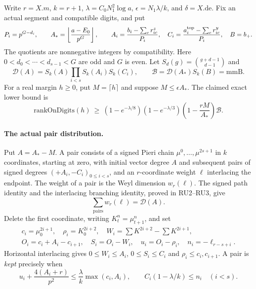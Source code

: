 \documentclass[11pt,a4paper]{article}
\numberwithin{equation}{section}
\theoremstyle{remark}\newtheorem{remark}[theorem]{Remark}
\begin{document}
Write $r=X.m$, $k=r+1$, $\lambda=C_0N_1^2\log a$,
$\epsilon=N_1\lambda/k$, and $\delta=X.\mathrm{de}$.
Fix an actual segment and compatible digits, and put
\[
 P_i=p^{G-d_i},\qquad A_*=\left\lfloor\frac{a-E_0}{p^G}\right\rfloor,
 \qquad
 A_i=\frac{b_i-\sum_c r^z_{ic}}{P_i},\quad
 C_i=\frac{a_i^{\rm top}-\sum_c r^y_{ic}}{P_i},\quad B=b_+.
\]
The quotients are nonnegative integers by compatibility.
Here $0<d_0<\cdots<d_{s-1}<G$ are odd and $G$ is even.
Let
$S_d(g)=\binom{g+d-1}{d-1}$ and
\[
 \mathcal D(A)=S_k(A)\prod_{i<s}S_k(A_i)S_k(C_i),\qquad
 \mathcal B=\mathcal D(A_*)S_k(B)=\mathrm{mmB}.
\]
For a real margin $h\ge0$, put $M=\lceil h\rceil$ and suppose
$M\le\epsilon A_*$. The claimed exact lower bound is
\[
 \mathrm{rankOnDigits}(h)\ \ge\
 (1-e^{-\lambda/8})(1-e^{-\lambda/3})
 \left(1-\frac{rM}{A_*}\right)\mathcal B.
 \tag{RD.1}
\]

\paragraph{The actual pair distribution.}
Put $A=A_*-M$. A pair consists of a signed Pieri chain
$\mu^0,\ldots,\mu^{2s+1}$ in $k$ coordinates, starting at zero,
with initial vector degree $A$ and subsequent pairs of signed degrees
$(+A_i,-C_i)_{0\le i<s}$, and an $r$-coordinate weight $\ell$
interlacing the endpoint.
The weight of a pair is the Weyl dimension $w_r(\ell)$.
The signed path identity and the interlacing branching identity,
proved in RU2--RU3, give
\[
                       \sum_{\text{pairs}}w_r(\ell)=\mathcal D(A).
 \tag{RD.2}
\]
Delete the first coordinate, writing $K_t^n=\mu_{t+1}^n$, and set
\[
\begin{gathered}
 c_i=\mu_0^{2i+1},\quad \rho_i=K_0^{2i+2},\quad
 W_i=\sum K^{2i+2}-\sum K^{2i+1},\\
 O_i=c_i+A_i-c_{i+1},\quad S_i=O_i-W_i,\quad
 u_i=O_i-\rho_i,\quad n_i=-\ell_{r-s+i}.
\end{gathered}
\]
Horizontal interlacing gives $0\le W_i\le A_i$, $0\le S_i\le C_i$
and $\rho_i\le c_i,c_{i+1}$. A pair is \emph{kept} precisely when
\[
 u_i+\frac{4(A_i+r)}{p^2}
       \le\frac\lambda k\max(c_i,A_i),\qquad
 C_i(1-\lambda/k)\le n_i\quad(i<s).
 \tag{RD.3}
\]
\end{document}
